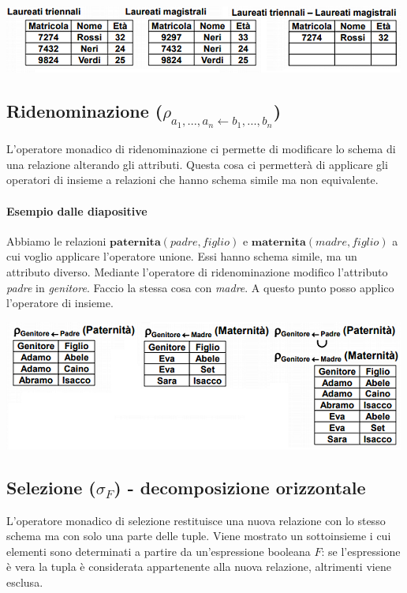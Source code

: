 \begin{center}
	\includegraphics{images/30.PNG}
\end{center}

\subsection{Ridenominazione ($\rho_{a_1,\dots,a_n \leftarrow b_1,\dots,b_n}$)}
L'operatore monadico di ridenominazione ci permette di modificare lo schema di una relazione alterando gli attributi. Questa cosa ci permetterà di applicare gli operatori di insieme a relazioni che hanno schema simile ma non equivalente.
\paragraph{Esempio dalle diapositive} Abbiamo le relazioni $\mathbf{paternita}(padre,figlio)$ e $\mathbf{maternita}(madre,figlio)$ a cui voglio applicare l'operatore unione. Essi hanno schema simile, ma un attributo diverso. Mediante l'operatore di ridenominazione modifico l'attributo \emph{padre} in \emph{genitore}. Faccio la stessa cosa con \emph{madre}. A questo punto posso applico l'operatore di insieme.

\begin{center}
	\includegraphics{images/31.PNG}
\end{center}

\subsection{Selezione ($\sigma_F$) - decomposizione orizzontale}
L'operatore monadico di selezione restituisce una nuova relazione con lo stesso schema ma con solo una parte delle tuple. Viene mostrato un sottoinsieme i cui elementi sono determinati a partire da un'espressione booleana $F$: se l'espressione è vera la tupla è considerata appartenente alla nuova relazione, altrimenti viene esclusa.
